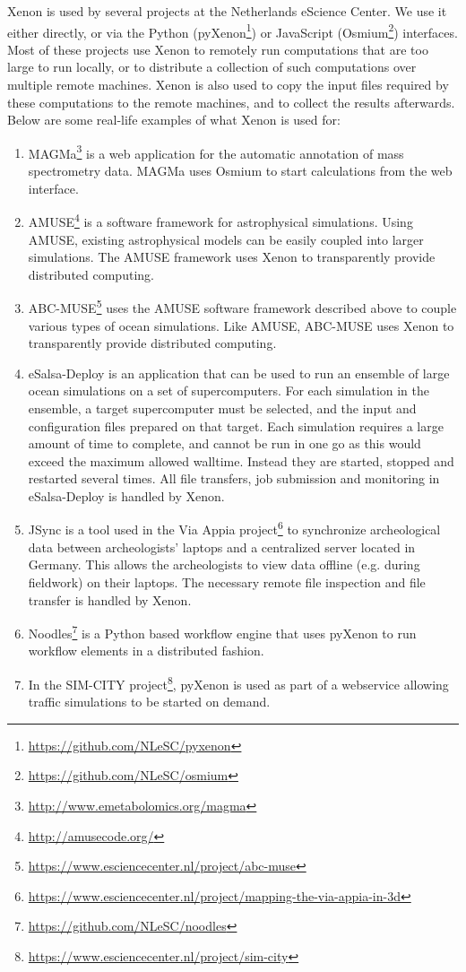 \documentclass[12pt, a4paper, twoside, openany, titlepage]{book}
\begin{document}
Xenon is used by several projects at the Netherlands eScience Center. We use it either directly, or via the Python (pyXenon\footnote{\url{https://github.com/NLeSC/pyxenon}}) or JavaScript (Osmium\footnote{\url{https://github.com/NLeSC/osmium}}) interfaces. Most of these projects use Xenon to remotely run computations that are too large to run locally, or to distribute a collection of such computations over multiple remote machines. Xenon is also used to copy the input files required by these computations to the remote machines, and to collect the results afterwards. Below are some real-life examples of what Xenon is used for:
\begin{enumerate}
\item{MAGMa\footnote{\url{http://www.emetabolomics.org/magma}} is a web application for the automatic annotation of mass spectrometry data. MAGMa uses Osmium to start calculations from the web interface.}
\item{AMUSE\footnote{\url{http://amusecode.org/}} is a software framework for astrophysical simulations. Using AMUSE, existing astrophysical models can be easily coupled into larger simulations. The AMUSE framework uses Xenon to transparently provide distributed computing.}
\item{ABC-MUSE\footnote{\url{https://www.esciencecenter.nl/project/abc-muse}} uses the AMUSE software framework described above to couple various types of ocean simulations. Like AMUSE, ABC-MUSE uses Xenon to transparently provide distributed computing.}
\item{eSalsa-Deploy is an application that can be used to run an ensemble of large ocean simulations on a set of supercomputers. For each simulation in the ensemble, a target supercomputer must be selected, and the input and configuration files prepared on that target. Each simulation requires a large amount of time to complete, and cannot be run in one go as this would exceed the maximum allowed walltime. Instead they are started, stopped and restarted several times. All file transfers, job submission and monitoring in eSalsa-Deploy is handled by Xenon.}
\item{JSync is a tool used in the Via Appia project\footnote{\url{https://www.esciencecenter.nl/project/mapping-the-via-appia-in-3d}} to synchronize archeological data between archeologists' laptops and a centralized server located in Germany. This allows the archeologists to view data offline (e.g. during fieldwork) on their laptops. The necessary remote file inspection and file transfer is handled by Xenon.}
\item{Noodles\footnote{\url{https://github.com/NLeSC/noodles}} is a Python based workflow engine that uses pyXenon to run workflow elements in a distributed fashion.}
\item{In the SIM-CITY project\footnote{\url{https://www.esciencecenter.nl/project/sim-city}}, pyXenon is used as part of a webservice allowing traffic simulations to be started on demand.}
\end{enumerate}
\end{document}
